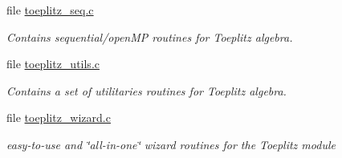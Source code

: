 \begin{DoxyCompactItemize}
file \hyperlink{toeplitz__seq_8c}{toeplitz\-\_\-seq.\-c}
\begin{DoxyCompactList}\small\item\em Contains sequential/open\-M\-P routines for Toeplitz algebra. \end{DoxyCompactList}\item 
file \hyperlink{toeplitz__utils_8c}{toeplitz\-\_\-utils.\-c}
\begin{DoxyCompactList}\small\item\em Contains a set of utilitaries routines for Toeplitz algebra. \end{DoxyCompactList}\item 
file \hyperlink{toeplitz__wizard_8c}{toeplitz\-\_\-wizard.\-c}
\begin{DoxyCompactList}\small\item\em easy-\/to-\/use and \char`\"{}all-\/in-\/one\char`\"{} wizard routines for the Toeplitz module \end{DoxyCompactList}\end{DoxyCompactItemize}
